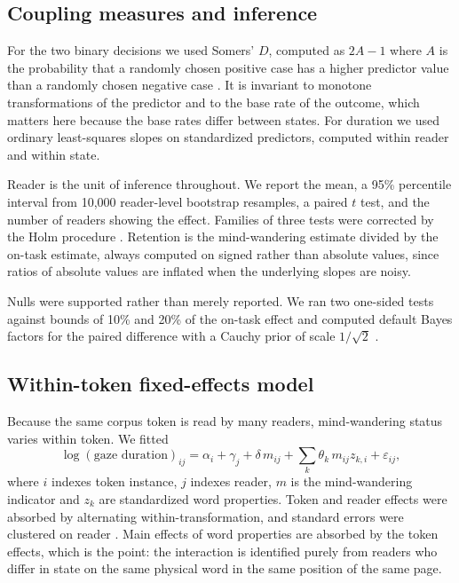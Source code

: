 \documentclass[11pt]{article}
\begin{document}
\subsection{Coupling measures and inference}

For the two binary decisions we used Somers' $D$, computed as $2A-1$ where $A$ is the
probability that a randomly chosen positive case has a higher predictor value than a randomly
chosen negative case \citep{somers1962}. It is invariant to monotone transformations of the
predictor and to the base rate of the outcome, which matters here because the base rates
differ between states. For duration we used ordinary least-squares slopes on standardized
predictors, computed within reader and within state.

Reader is the unit of inference throughout. We report the mean, a 95\% percentile interval
from 10{,}000 reader-level bootstrap resamples, a paired $t$ test, and the number of readers
showing the effect. Families of three tests were corrected by the Holm procedure
\citep{holm1979}. Retention is the mind-wandering estimate divided by the on-task estimate,
always computed on signed rather than absolute values, since ratios of absolute values are
inflated when the underlying slopes are noisy.

Nulls were supported rather than merely reported. We ran two one-sided tests against bounds of
10\% and 20\% of the on-task effect \citep{lakens2017} and computed default Bayes factors for
the paired difference with a Cauchy prior of scale $1/\sqrt{2}$ \citep{rouder2009}.

\subsection{Within-token fixed-effects model}

Because the same corpus token is read by many readers, mind-wandering status varies within
token. We fitted
\[
\log(\text{gaze duration})_{ij}
= \alpha_i + \gamma_j + \delta\,m_{ij} + \sum_k \theta_k\,m_{ij}z_{k,i} + \varepsilon_{ij},
\]
where $i$ indexes token instance, $j$ indexes reader, $m$ is the mind-wandering indicator and
$z_k$ are standardized word properties. Token and reader effects were absorbed by alternating
within-transformation, and standard errors were clustered on reader
\citep{cameron2011}. Main effects of word properties are absorbed by the token effects, which
is the point: the interaction is identified purely from readers who differ in state on the
same physical word in the same position of the same page.
\end{document}
